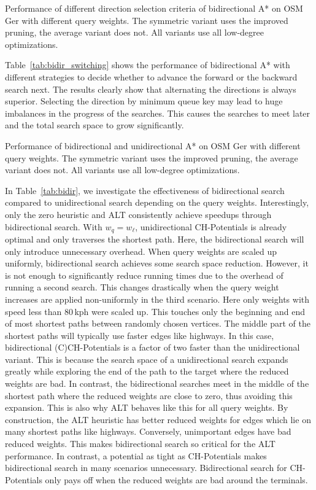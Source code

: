 \documentclass[manuscript]{acmart}
\begin{document}
\begin{table}
\centering
\caption{
Performance of different direction selection criteria of bidirectional A* on OSM Ger with different query weights.
The symmetric variant uses the improved pruning, the average variant does not.
All variants use all low-degree optimizations.
}\label{tab:bidir_switching}

\end{table}

Table~\ref{tab:bidir_switching} shows the performance of bidirectional A* with different strategies to decide whether to advance the forward or the backward search next.
The results clearly show that alternating the directions is always superior.
Selecting the direction by minimum queue key may lead to huge imbalances in the progress of the searches.
This causes the searches to meet later and the total search space to grow significantly.

\begin{table}
\centering
\caption{
Performance of bidirectional and unidirectional A* on OSM Ger with different query weights.
The symmetric variant uses the improved pruning, the average variant does not.
All variants use all low-degree optimizations.
}\label{tab:bidir}

\end{table}

In Table~\ref{tab:bidir}, we investigate the effectiveness of bidirectional search compared to unidirectional search depending on the query weights.
Interestingly, only the zero heuristic and ALT consistently achieve speedups through bidirectional search.
With $w_q = w_{\ell}$, unidirectional CH-Potentials is already optimal and only traverses the shortest path.
Here, the bidirectional search will only introduce unnecessary overhead.
When query weights are scaled up uniformly, bidirectional search achieves some search space reduction.
However, it is not enough to significantly reduce running times due to the overhead of running a second search.
This changes drastically when the query weight increases are applied non-uniformly in the third scenario.
Here only weights with speed less than 80\,kph were scaled up.
This touches only the beginning and end of most shortest paths between randomly chosen vertices.
The middle part of the shortest paths will typically use faster edges like highways.
In this case, bidirectional (C)CH-Potentials is a factor of two faster than the unidirectional variant.
This is because the search space of a unidirectional search expands greatly while exploring the end of the path to the target where the reduced weights are bad.
In contrast, the bidirectional searches meet in the middle of the shortest path where the reduced weights are close to zero, thus avoiding this expansion.
This is also why ALT behaves like this for all query weights.
By construction, the ALT heuristic has better reduced weights for edges which lie on many shortest paths like highways.
Conversely, unimportant edges have bad reduced weights.
This makes bidirectional search so critical for the ALT performance.
In contrast, a potential as tight as CH-Potentials makes bidirectional search in many scenarios unnecessary.
Bidirectional search for CH-Potentials only pays off when the reduced weights are bad around the terminals.
\end{document}
